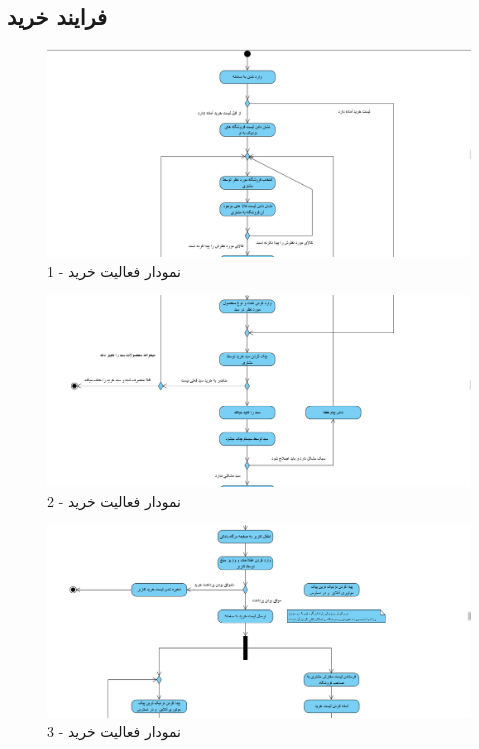 \documentclass[12pt,a4paper]{article}
\begin{document}
	\subsection{فرایند خرید} \label{section.activity.buy}
		\begin{figure}[h!]
			\begin{center}
				\includegraphics[width=14cm]{images/Buy Activity Diagram 1.png}
			\end{center}
			\caption{نمودار فعالیت خرید - 1}
		\end{figure}
		\begin{figure}[h!]
			\begin{center}
				\includegraphics[width=14cm]{images/Buy Activity Diagram 2.png}
			\end{center}
			\caption{نمودار فعالیت خرید - 2}
		\end{figure}
		\pagebreak
		\begin{figure}[h!]
			\begin{center}
				\includegraphics[width=14cm]{images/Buy Activity Diagram 3.png}
			\end{center}
			\caption{نمودار فعالیت خرید - 3}
		\end{figure}
\end{document}
